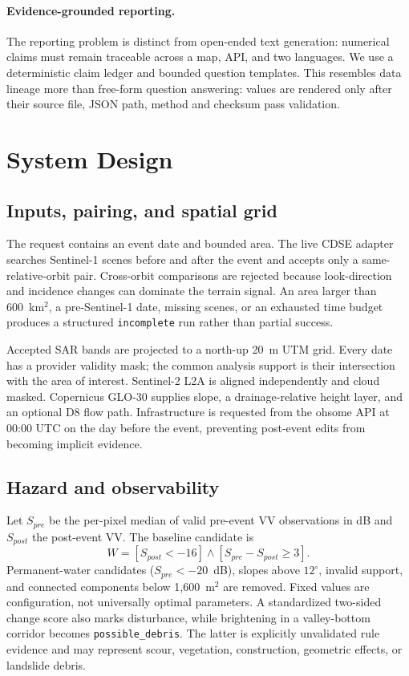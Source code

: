 \documentclass[10pt,twocolumn,letterpaper]{article}
\begin{document}
\paragraph{Evidence-grounded reporting.}
The reporting problem is distinct from open-ended text generation: numerical
claims must remain traceable across a map, API, and two languages. We use a
deterministic claim ledger and bounded question templates. This resembles data
lineage more than free-form question answering: values are rendered only after
their source file, JSON path, method and checksum pass validation.

\section{System Design}
\subsection{Inputs, pairing, and spatial grid}
The request contains an event date and bounded area. The live CDSE adapter
searches Sentinel-1 scenes before and after the event and accepts only a
same-relative-orbit pair. Cross-orbit comparisons are rejected because
look-direction and incidence changes can dominate the terrain signal. An area
larger than 600~km$^2$, a pre-Sentinel-1 date, missing scenes, or an exhausted
time budget produces a structured \texttt{incomplete} run rather than partial
success.

Accepted SAR bands are projected to a north-up 20~m UTM grid. Every date has a
provider validity mask; the common analysis support is their intersection with
the area of interest. Sentinel-2 L2A is aligned independently and cloud masked.
Copernicus GLO-30 supplies slope, a drainage-relative height layer, and an
optional D8 flow path. Infrastructure is requested from the ohsome API at 00:00
UTC on the day before the event, preventing post-event edits from becoming
implicit evidence.

\subsection{Hazard and observability}
Let $S_{pre}$ be the per-pixel median of valid pre-event VV observations in dB
and $S_{post}$ the post-event VV. The baseline candidate is
\begin{equation}
W = [S_{post}<-16] \land [S_{pre}-S_{post}\ge3].
\end{equation}
Permanent-water candidates ($S_{pre}<-20$~dB), slopes above $12^\circ$, invalid
support, and connected components below 1,600~m$^2$ are removed. Fixed values are
configuration, not universally optimal parameters. A standardized two-sided
change score also marks disturbance, while brightening in a valley-bottom
corridor becomes \texttt{possible\_debris}. The latter is explicitly unvalidated
rule evidence and may represent scour, vegetation, construction, geometric
effects, or landslide debris.
\end{document}
